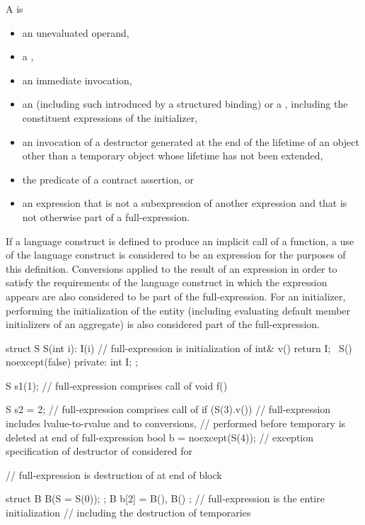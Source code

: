 \pnum
A  is
\begin{itemize}
\item
an unevaluated operand,
\item
a ,
\item
an immediate invocation,
\item
an 
(including such introduced by a structured binding) or
a ,
including the constituent expressions of the initializer,
\item
an invocation of a destructor generated at the end of the lifetime
of an object other than a temporary object
whose lifetime has not been extended,
\item
the predicate of a contract assertion, or
\item
an expression that is not a subexpression of another expression and
that is not otherwise part of a full-expression.
\end{itemize}
If a language construct is defined to produce an implicit call of a function,
a use of the language construct is considered to be an expression
for the purposes of this definition.
Conversions applied to the result of an expression in order to satisfy the requirements
of the language construct in which the expression appears
are also considered to be part of the full-expression.
For an initializer, performing the initialization of the entity
(including evaluating default member initializers of an aggregate)
is also considered part of the full-expression.
\begin{example}
\begin{codeblock}
struct S {
  S(int i): I(i) { }            // full-expression is initialization of 
  int& v() { return I; }
  ~S() noexcept(false) { }
private:
  int I;
};

S s1(1);                        // full-expression comprises call of 
void f() {
  S s2 = 2;                     // full-expression comprises call of 
  if (S(3).v())                 // full-expression includes lvalue-to-rvalue and  to  conversions,
                                // performed before temporary is deleted at end of full-expression
  { }
  bool b = noexcept(S(4));      // exception specification of destructor of  considered for 

  // full-expression is destruction of  at end of block
}
struct B {
  B(S = S(0));
};
B b[2] = { B(), B() };          // full-expression is the entire initialization
                                // including the destruction of temporaries
\end{codeblock}
\end{example}

